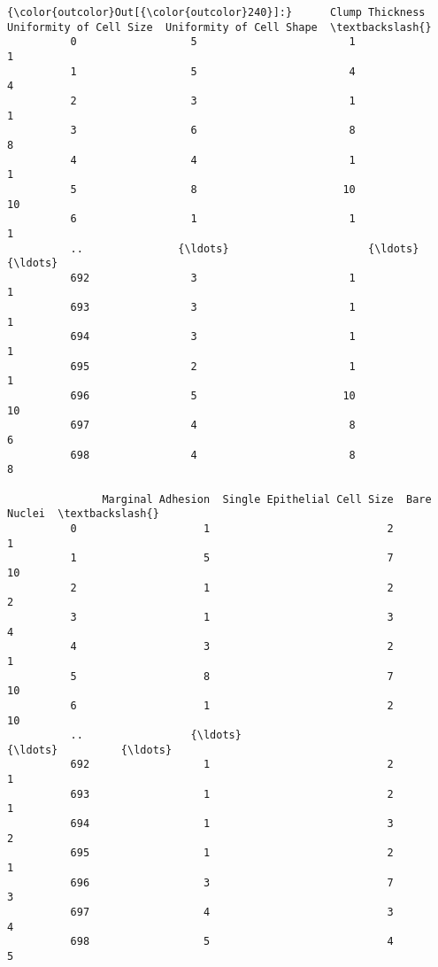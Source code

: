 \documentclass[11pt]{article}
\begin{document}
\begin{Verbatim}[commandchars=\\\{\}]
{\color{outcolor}Out[{\color{outcolor}240}]:}      Clump Thickness  Uniformity of Cell Size  Uniformity of Cell Shape  \textbackslash{}
          0                  5                        1                         1   
          1                  5                        4                         4   
          2                  3                        1                         1   
          3                  6                        8                         8   
          4                  4                        1                         1   
          5                  8                       10                        10   
          6                  1                        1                         1   
          ..               {\ldots}                      {\ldots}                       {\ldots}   
          692                3                        1                         1   
          693                3                        1                         1   
          694                3                        1                         1   
          695                2                        1                         1   
          696                5                       10                        10   
          697                4                        8                         6   
          698                4                        8                         8   
          
               Marginal Adhesion  Single Epithelial Cell Size  Bare Nuclei  \textbackslash{}
          0                    1                            2            1   
          1                    5                            7           10   
          2                    1                            2            2   
          3                    1                            3            4   
          4                    3                            2            1   
          5                    8                            7           10   
          6                    1                            2           10   
          ..                 {\ldots}                          {\ldots}          {\ldots}   
          692                  1                            2            1   
          693                  1                            2            1   
          694                  1                            3            2   
          695                  1                            2            1   
          696                  3                            7            3   
          697                  4                            3            4   
          698                  5                            4            5   
          

\end{Verbatim}
\end{document}
